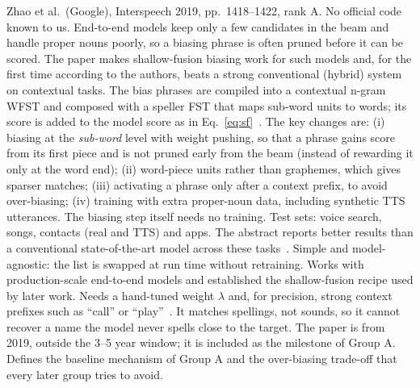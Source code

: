   {Zhao et al.\ (Google), Interspeech 2019, pp.~1418--1422, rank A. No official code known to us.}
  {End-to-end models keep only a few candidates in the beam and handle proper nouns poorly, so a biasing phrase is often
   pruned before it can be scored. The paper makes shallow-fusion biasing work for such models and, for the first time
   according to the authors, beats a strong conventional (hybrid) system on contextual tasks.}
  {The bias phrases are compiled into a contextual n-gram WFST and composed with a speller FST that maps sub-word units to words;
   its score is added to the model score as in Eq.~\ref{eq:sf}~\cite{zhao2019}.
   The key changes are: (i) biasing at the \emph{sub-word} level with weight pushing, so that a phrase gains score
   from its first piece and is not pruned early from the beam (instead of rewarding it only at the word end);
   (ii) word-piece units rather than graphemes, which gives sparser matches; (iii) activating a phrase only after
   a context prefix, to avoid over-biasing; (iv) training with extra proper-noun data, including synthetic TTS utterances.
   The biasing step itself needs no training.}
  {Test sets: voice search, songs, contacts (real and TTS) and apps. The abstract reports better results than a conventional
   state-of-the-art model across these tasks~\cite{zhao2019}. }
  {Simple and model-agnostic: the list is swapped at run time without retraining.
   Works with production-scale end-to-end models and established the shallow-fusion recipe used by later work.}
  {Needs a hand-tuned weight $\lambda$ and, for precision, strong context prefixes such as ``call'' or ``play''~\cite{le2021triebias}.
   It matches spellings, not sounds, so it cannot recover a name the model never spells close to the target.
   The paper is from 2019, outside the 3--5 year window; it is included as the milestone of Group A.}
  {Defines the baseline mechanism of Group A and the over-biasing trade-off that every later group tries to avoid.}

